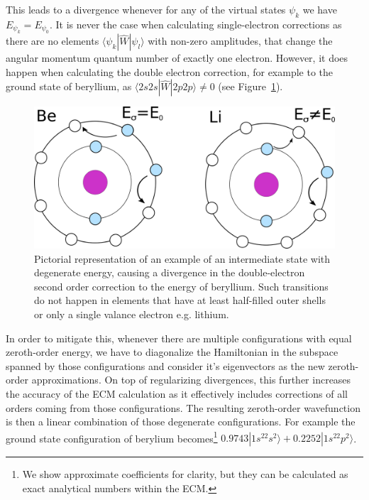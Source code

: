 This leads to a divergence whenever for any of the virtual states $\psi_k$ we have $E_{\psi_k} = E_{\psi_0}$. It is never the case when calculating single-electron corrections as there are no elements $\langle \psi_k|\widehat{W}|\psi_l\rangle$ with non-zero amplitudes, that change the angular momentum quantum number of exactly one electron. However, it does happen when calculating the double electron correction, for example to the ground state of beryllium, as $\langle 2s 2s|\widehat{W}|2p2p\rangle \neq 0$ (see Figure~\ref{degeneracyFig}).

	\begin{figure}
			\centering
			\includegraphics[width=120mm]{Graphs/degeneracy.png} 
			\caption{Pictorial representation of an example of an intermediate state
				with degenerate energy, causing a divergence in
				the double-electron second order correction to the energy of beryllium. Such transitions do not happen in elements that have at least half-filled outer shells or only a single valance electron e.g. lithium.} \label{degeneracyFig}
		\end{figure}
	
	In order to mitigate this, whenever there are multiple configurations with equal zeroth-order energy, we have to diagonalize the Hamiltonian in the subspace spanned by those configurations and consider it's eigenvectors as the new zeroth-order approximations. On top of regularizing divergences, this further increases the accuracy of the ECM calculation as it effectively includes corrections of all orders coming from those configurations. The resulting zeroth-order wavefunction is then a linear combination of those degenerate configurations. For example the ground state configuration of berylium becomes\footnote{We show approximate coefficients for clarity, but they can be calculated as exact analytical numbers within the ECM.} $0.9743|1s^22s^2\rangle + 0.2252|1s^22p^2\rangle$.
	
